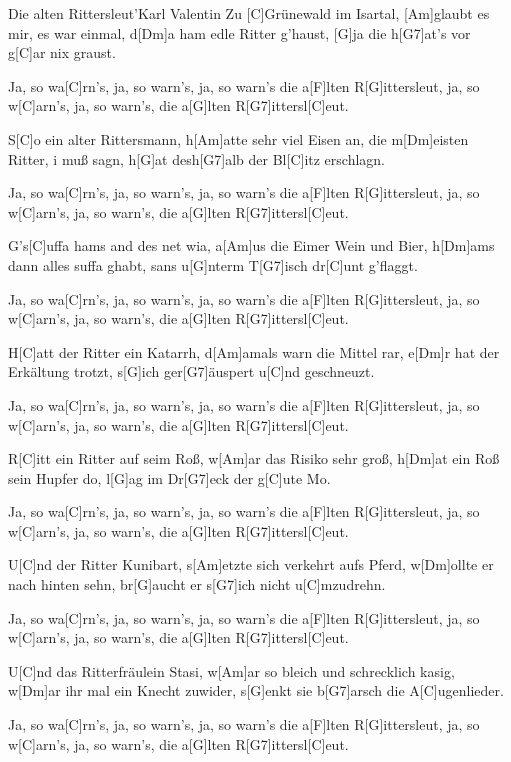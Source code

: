 \documentclass[../main.tex]{subfiles}
\begin{document}
\begin{song}{Die alten Rittersleut'}{Karl Valentin}{}
Zu [C]Grünewald im Isartal, [Am]glaubt es mir, es war einmal,
d[Dm]a ham edle Ritter g'haust, [G]ja die h[G7]at's vor g[C]ar nix graust.

Ja, so wa[C]rn's, ja, so warn's, ja, so warn's die a[F]lten R[G]ittersleut, ja, so w[C]arn's, ja, so warn's, die a[G]lten R[G7]ittersl[C]eut.

S[C]o ein alter Rittersmann, h[Am]atte sehr viel Eisen an,
die m[Dm]eisten Ritter, i muß sagn, h[G]at desh[G7]alb der Bl[C]itz erschlagn.

Ja, so wa[C]rn's, ja, so warn's, ja, so warn's die a[F]lten R[G]ittersleut, ja, so w[C]arn's, ja, so warn's, die a[G]lten R[G7]ittersl[C]eut.

G's[C]uffa hams and des net wia, a[Am]us die Eimer Wein und Bier,
h[Dm]ams dann alles suffa ghabt, sans u[G]nterm T[G7]isch dr[C]unt g'flaggt.

Ja, so wa[C]rn's, ja, so warn's, ja, so warn's die a[F]lten R[G]ittersleut, ja, so w[C]arn's, ja, so warn's, die a[G]lten R[G7]ittersl[C]eut.

H[C]att der Ritter ein Katarrh, d[Am]amals warn die Mittel rar,
e[Dm]r hat der Erkältung trotzt, s[G]ich ger[G7]{ä}uspert u[C]nd geschneuzt.

Ja, so wa[C]rn's, ja, so warn's, ja, so warn's die a[F]lten R[G]ittersleut, ja, so w[C]arn's, ja, so warn's, die a[G]lten R[G7]ittersl[C]eut.

R[C]itt ein Ritter auf seim Roß, w[Am]ar das Risiko sehr groß,
h[Dm]at ein Roß sein Hupfer do, l[G]ag im Dr[G7]eck der g[C]ute Mo.

Ja, so wa[C]rn's, ja, so warn's, ja, so warn's die a[F]lten R[G]ittersleut, ja, so w[C]arn's, ja, so warn's, die a[G]lten R[G7]ittersl[C]eut.

U[C]nd der Ritter Kunibart, s[Am]etzte sich verkehrt aufs Pferd,
w[Dm]ollte er nach hinten sehn, br[G]aucht er s[G7]ich nicht u[C]mzudrehn.

Ja, so wa[C]rn's, ja, so warn's, ja, so warn's die a[F]lten R[G]ittersleut, ja, so w[C]arn's, ja, so warn's, die a[G]lten R[G7]ittersl[C]eut.

U[C]nd das Ritterfräulein Stasi, w[Am]ar so bleich und schrecklich kasig,
w[Dm]ar ihr mal ein Knecht zuwider, s[G]enkt sie b[G7]arsch die A[C]ugenlieder.

Ja, so wa[C]rn's, ja, so warn's, ja, so warn's die a[F]lten R[G]ittersleut, ja, so w[C]arn's, ja, so warn's, die a[G]lten R[G7]ittersl[C]eut.


\end{song}
\end{document}
